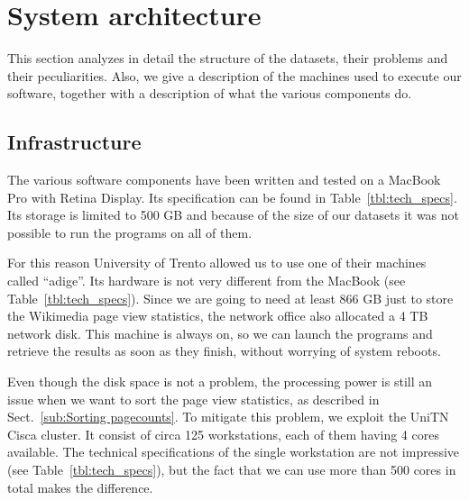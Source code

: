 
\chapter{System architecture}
\label{cha:system_architecture}
This section analyzes in detail the structure of the datasets, their problems and their peculiarities.
Also, we give a description of the machines used to execute our software, together with a description of what the various components do.

\section{Infrastructure}
\label{sec:infrastructure}
The various software components have been written and tested on a MacBook Pro with Retina Display.
Its specification can be found in Table~\ref{tbl:tech_specs}.
Its storage is limited to 500 GB and because of the size of our datasets it was not possible to run the programs on all of them.

For this reason University of Trento allowed us to use one of their machines called ``adige''.
Its hardware is not very different from the MacBook (see Table~\ref{tbl:tech_specs}).
Since we are going to need at least 866 GB just to store the Wikimedia page view statistics, the network office also allocated a 4 TB network disk.
This machine is always on, so we can launch the programs and retrieve the results as soon as they finish, without worrying of system reboots.

Even though the disk space is not a problem, the processing power is still an issue when we want to sort the page view statistics, as described in Sect.~\ref{sub:Sorting pagecounts}.
To mitigate this problem, we exploit the UniTN Cisca cluster.
It consist of circa 125 workstations, each of them having 4 cores available.
The technical specifications of the single workstation are not impressive (see Table~\ref{tbl:tech_specs}), but the fact that we can use more than 500 cores in total makes the difference.

